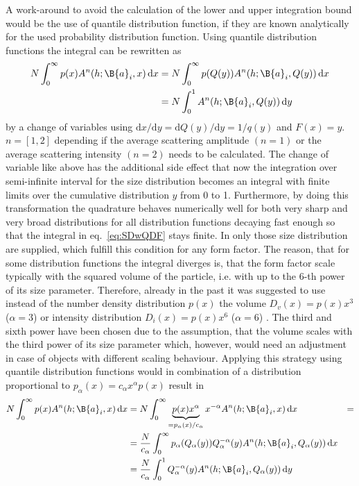 A work-around to avoid the calculation of the lower and upper integration bound would be the use of quantile distribution function, if they are known analytically for the used probability distribution function. Using quantile distribution functions the integral can be rewritten as
\begin{align}\label{eq:SDwQDF}
  N \int_0^\infty p(x) A^n(h;\B{a}_i,x)\, \mathrm{d}x & = N \int_0^\infty p(Q(y)) A^n(h;\B{a}_i,Q(y)) \, \mathrm{d}x \\
   & = N \int_0^1 A^n(h;\B{a}_i,Q(y)) \, \mathrm{d}y
\end{align}
by a change of variables using $\mathrm{d}x/\mathrm{d}y=\mathrm{d}Q(y)/\mathrm{d}y=1/q(y)$ and $F(x)=y$. $n=[1,2]$ depending if the average scattering amplitude $(n=1)$ or the average scattering intensity $(n=2)$ needs to be calculated. The change of variable like above has the additional side effect that now the integration over semi-infinite interval for the size distribution becomes an integral with finite limits over the cumulative  distribution $y$ from  0  to  1. Furthermore, by doing this transformation the quadrature behaves numerically well for both very sharp and very broad distributions for all distribution functions decaying fast enough so that the integral in eq.\ \ref{eq:SDwQDF} stays finite. In \SASfit only those size distribution are supplied, which fulfill this condition for any form factor. The reason, that for some distribution functions  the integral diverges is, that the form factor scale typically with the squared volume of the particle, i.e. with up to the 6-th power of its size parameter. Therefore, already in the past it was suggested to use instead of the number density distribution $p(x)$ the volume $D_v(x)=p(x)x^3$ ($\alpha=3$) or intensity distribution $D_i(x)=p(x)x^6$ ($\alpha=6$) \cite{Glatter1980}. The third and sixth power have been chosen due to the assumption, that the volume scales with the third power of its size parameter which, however, would need an adjustment in case of objects with different scaling behaviour.
Applying this strategy using quantile distribution functions would in combination of a distribution proportional to $p_\alpha(x) = c_\alpha x^\alpha p(x)$ result in
\begin{align}\label{eq:intensity_alpha_quantile}
N  \int_0^\infty p(x) A^n(h;\B{a}_i,x)\, \mathrm{d}x & = N \int_0^\infty \underbrace{p(x) x^\alpha}_{=p_\alpha(x)/c_\alpha} x^{-\alpha} A^n(h;\B{a}_i,x)\, \mathrm{d}x & = \\
   &= \frac{N}{c_\alpha}\int_0^\infty p_\alpha(Q_\alpha(y)) Q^{-\alpha}_\alpha(y) A^n(h;\B{a}_i,Q_\alpha(y))\, \mathrm{d}x\\
   &= \frac{N}{c_\alpha} \int_0^1 Q^{-\alpha}_\alpha(y) A^n(h;\B{a}_i,Q_\alpha(y))\, \mathrm{d}y \label{eq:QDFsd}
\end{align}
